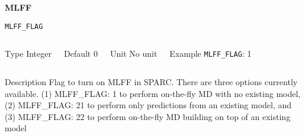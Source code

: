
\begin{frame}[allowframebreaks,c]{} \label{MLFF}

\begin{center}
\Huge \textbf{MLFF}
\end{center}

\end{frame}

\begin{frame}[allowframebreaks]{\texttt{MLFF\_FLAG}} \label{MLFF_FLAG}
\vspace*{-12pt}
\begin{columns}
\begin{block}{Type}
Integer
\end{block}

\begin{block}{Default}
0
\end{block}

\begin{block}{Unit}
No unit
\end{block}

\begin{block}{Example}
\texttt{MLFF\_FLAG}: 1
\end{block}
\end{columns}

\begin{block}{Description}
Flag to turn on MLFF in SPARC. There are three options currently available. (1) MLFF\_FLAG: 1 to perform on-the-fly MD with no existing model, (2) MLFF\_FLAG: 21 to perform only predictions from an existing model, and (3) MLFF\_FLAG: 22 to perform on-the-fly MD building on top of an existing model
\end{block}

\end{frame}





